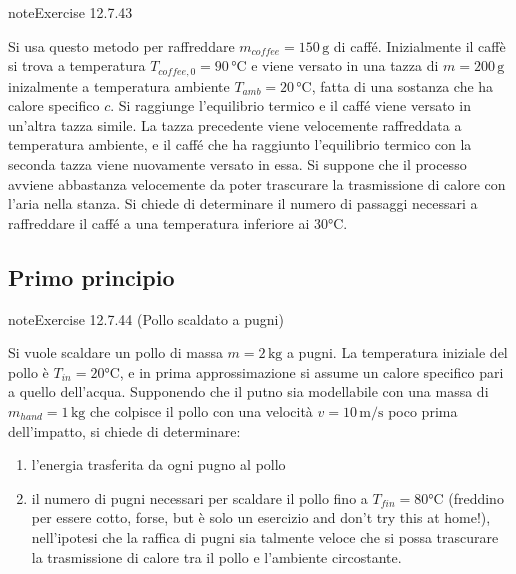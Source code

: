 \documentclass[letterpaper,10pt,italian]{jupyterBook}
\begin{document}
\begin{sphinxadmonition}{note}{Exercise 12.7.43}



\sphinxAtStartPar
Si usa questo metodo per raffreddare \(m_{coffee} = 150 \, \text{g}\) di caffé. Inizialmente il caffè si trova a temperatura \(T_{coffee,0} = 90 \, \text{°C}\) e viene versato in una tazza di \(m = 200 \, \text{g}\) inizalmente a temperatura ambiente \(T_{amb} = 20 \, \text{°C}\), fatta di una sostanza che ha calore specifico \(c\). Si raggiunge l’equilibrio termico e il caffé viene versato in un’altra tazza simile. La tazza precedente viene velocemente raffreddata a temperatura ambiente, e il caffé che ha raggiunto l’equilibrio termico con la seconda tazza viene nuovamente versato in essa. Si suppone che il processo avviene abbastanza velocemente da poter trascurare la trasmissione di calore con l’aria nella stanza. Si chiede di determinare il numero di passaggi necessari a raffreddare il caffé a una temperatura inferiore ai \(30 \text{°C}\).
\end{sphinxadmonition}


\subsection{Primo principio}
\label{\detokenize{ch/thermodynamics/principles-problems:primo-principio}} \label{exercise:ch/thermodynamics/principles-problems-exercise-43}

\begin{sphinxadmonition}{note}{Exercise 12.7.44 (Pollo scaldato a pugni)}



\sphinxAtStartPar
Si vuole scaldare un pollo di massa \(m = 2 \, \text{kg}\) a pugni. La temperatura iniziale del pollo è \(T_{in} = 20 \text{°C}\), e in prima approssimazione si assume un calore specifico pari a quello dell’acqua. Supponendo che il putno sia modellabile con una massa di \(m_{hand} = 1 \, \text{kg}\) che colpisce il pollo con una velocità \(v = 10 \, \text{m/s}\) poco prima dell’impatto, si chiede di determinare:
\begin{enumerate}
%
\item {} 
\sphinxAtStartPar
l’energia trasferita da ogni pugno al pollo

\item {} 
\sphinxAtStartPar
il numero di pugni necessari per scaldare il pollo fino a \(T_{fin} = 80 \text{°C}\) (freddino per essere cotto, forse, but è solo un esercizio and don’t try this at home!), nell’ipotesi che la raffica di pugni sia talmente veloce che si possa trascurare la trasmissione di calore tra il pollo e l’ambiente circostante.

\end{enumerate}
\end{sphinxadmonition}
 \label{exercise:ch/thermodynamics/principles-problems-exercise-44}
\end{document}
